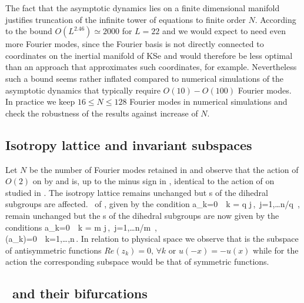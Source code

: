 The fact that the asymptotic dynamics lies on a finite
dimensional manifold justifies truncation of the infinite tower
of equations  to finite order $N$. According to
the bound $O(L^{2.46})\simeq2000$ for $L=22$ and we would expect to need even more
Fourier modes, since the Fourier basis is not directly
connected to coordinates on the inertial manifold of KSe and
would therefore be less optimal than an approach that
approximates such coordinates, for
example.
Nevertheless such a bound seems rather inflated compared to
numerical simulations of the asymptotic dynamics that typically
require $O(10)-O(100)$ Fourier modes. In practice we keep
$16\leq N \leq 128$ Fourier modes in numerical simulations and
check the robustness of the results against increase of $N$.

\subsection{Isotropy lattice and invariant subspaces}
\label{sec:ksIso}

Let $N$ be the number of Fourier modes retained in 
and observe that the action of $O(2)$
on  by  and  is,
up to the minus sign in , identical
to the action  of  on  studied
in .
The isotropy lattice remains unchanged but \fixedsp s of the dihedral subgroups are affected.
\Fixedsp\ of , given by the condition
\beq
	a_k=0\ \ k = q j\,,\ j=1,\ldots\lfloor n/q \rfloor\,,
	\label{eq:O2CqFix}
\eeq
remain unchanged but the \fixedsp s of the dihedral subgroups  are now given by the conditions
\bea
	a_k=0\ \ k = m j\,,\ j=1,\ldots\lfloor n/m \rfloor\,, \\
	\Re(a_k)=0\ \ k=1,\ldots,n\,.
	\label{eq:O2ksDqFix}
\eea
In relation to physical space we observe that  is the subspace of antisymmetric functions $Re(z_k)=0,\, \forall k$ or $u(-x)=-u(x)$ while for the action  the corresponding
subspace would be that of symmetric functions.

\subsection{\Eqva\ and their bifurcations}

